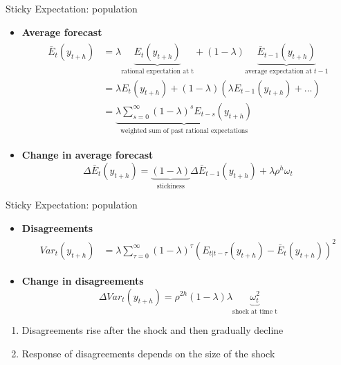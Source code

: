 \documentclass{beamer}
\begin{document}
\begin{frame}{Sticky Expectation: population}
\begin{itemize}
	\item \textbf{Average forecast} 
	\begin{eqnarray*}
		\begin{aligned}
			\bar E_t(y_{t+h}) & = \lambda \underbrace{E_t(y_{t+h})}_{\text{rational expectation at t}} + (1-\lambda) \underbrace{\bar E_{t-1}(y_{t+h})}_{\text{average expectation at } t-1} \\
			& = \lambda E_t(y_{t+h}) + (1-\lambda) (\lambda E_{t-1}(y_{t+h})+ ...) \\
			& =\underbrace{ \lambda \sum^{\infty}_{s=0} (1-\lambda)^s E_{t-s}(y_{t+h})}_{\text{weighted sum of past rational expectations}}
		\end{aligned}
	\end{eqnarray*}
	\item \textbf{Change in average forecast}
	$$\Delta \bar E_t(y_{t+h})=\underbrace{(1-\lambda)}_{\text{stickiness}} \Delta \bar E_{t-1}(y_{t+h}) + \lambda \rho^h \omega_t$$ 
\end{itemize}
\end{frame}


\begin{frame}{Sticky Expectation: population}
\begin{itemize}
\item \textbf{Disagreements}
\begin{eqnarray*}
	\begin{aligned}
		Var_t(y_{t+h} ) & = \lambda \sum^{\infty}_{\tau=0} (1-\lambda)^{\tau} (E_{t|t-\tau}(y_{t+h}) - \bar E_t(y_{t+h}))^2  
	\end{aligned}
\end{eqnarray*}
\item \textbf{Change in disagreements}
$$\Delta Var_t (y_{t+h}) = \rho^{2h} (1-\lambda)\lambda \underbrace{\omega^2_t}_{\text{shock at time t}}$$
\end{itemize}

\begin{enumerate}
\item Disagreements rise after the shock and then gradually decline 
\item Response of disagreements depends on the size of the shock
\end{enumerate}
\end{frame}
\end{document}
